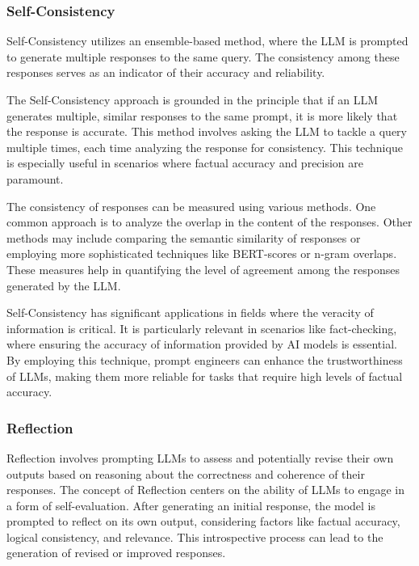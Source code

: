 \documentclass[conference]{IEEEtran}
\begin{document}
\subsubsection{Self-Consistency}
Self-Consistency \cite{manakul2023selfcheckgpt} utilizes an ensemble-based method, where the LLM is prompted to generate multiple responses to the same query. The consistency among these responses serves as an indicator of their accuracy and reliability.

The Self-Consistency approach is grounded in the principle that if an LLM generates multiple, similar responses to the same prompt, it is more likely that the response is accurate. This method involves asking the LLM to tackle a query multiple times, each time analyzing the response for consistency. This technique is especially useful in scenarios where factual accuracy and precision are paramount.

The consistency of responses can be measured using various methods. One common approach is to analyze the overlap in the content of the responses. Other methods may include comparing the semantic similarity of responses or employing more sophisticated techniques like BERT-scores or n-gram overlaps. These measures help in quantifying the level of agreement among the responses generated by the LLM.

Self-Consistency has significant applications in fields where the veracity of information is critical. It is particularly relevant in scenarios like fact-checking, where ensuring the accuracy of information provided by AI models is essential. By employing this technique, prompt engineers can enhance the trustworthiness of LLMs, making them more reliable for tasks that require high levels of factual accuracy.






\subsubsection{Reflection}
Reflection \cite{shinn2023reflexion} involves prompting LLMs to assess and potentially revise their own outputs based on reasoning about the correctness and coherence of their responses. The concept of Reflection centers on the ability of LLMs to engage in a form of self-evaluation. After generating an initial response, the model is prompted to reflect on its own output, considering factors like factual accuracy, logical consistency, and relevance. This introspective process can lead to the generation of revised or improved responses.
\end{document}
